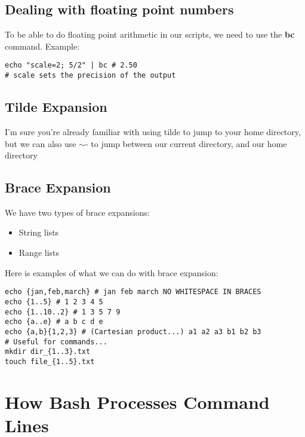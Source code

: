 \documentclass{report}
\begin{document}
    \bigbreak \noindent 
    \subsection{Dealing with floating point numbers}
    \bigbreak \noindent 
    To be able to do floating point arithmetic in our scripts, we need to use the \textbf{bc} command.
    \bigbreak \noindent 
    Example:
    \begin{mdframed}[style=purplebox]
    \begin{verbatim}
echo "scale=2; 5/2" | bc # 2.50
# scale sets the precision of the output
    \end{verbatim}
    \bigbreak \noindent
    \end{mdframed}
    \bigbreak \noindent 

    \pagebreak \bigbreak \noindent 
    \subsection{Tilde Expansion}
    \bigbreak \noindent 
    I'm sure you're already familiar with using tilde to jump to your home directory, but we can also use $\sim$- to jump between our current directory, and our home directory

    \bigbreak \noindent 
    \subsection{Brace Expansion}
    \bigbreak \noindent 
    We have two types of brace expansions:
    \begin{itemize}
        \item String lists
        \item Range lists
    \end{itemize}
    \bigbreak \noindent 
    Here is examples of what we can do with brace expansion:
    \bigbreak \noindent 
    \begin{mdframed}[style=purplebox]
    \begin{verbatim}
echo {jan,feb,march} # jan feb march NO WHITESPACE IN BRACES
echo {1..5} # 1 2 3 4 5
echo {1..10..2} # 1 3 5 7 9
echo {a..e} # a b c d e
echo {a,b}{1,2,3} # (Cartesian product...) a1 a2 a3 b1 b2 b3
# Useful for commands...
mkdir dir_{1..3}.txt
touch file_{1..5}.txt
    \end{verbatim}
    \bigbreak \noindent
    \end{mdframed}

    \pagebreak \bigbreak \noindent 
    \section{\LARGE How Bash Processes Command Lines}
    \bigbreak \noindent 

    





    
\end{document}
